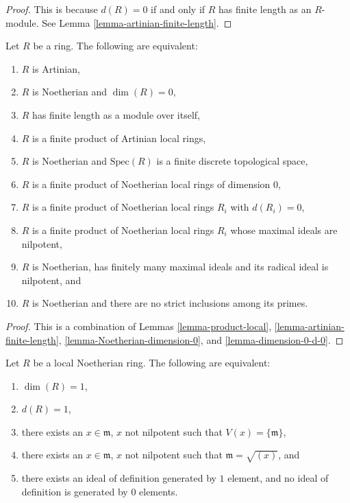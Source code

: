 \begin{proof}
This is because $d(R) = 0$ if and only if $R$ has finite
length as an $R$-module. See Lemma \ref{lemma-artinian-finite-length}.
\end{proof}

\begin{proposition}
\label{proposition-dimension-zero-ring}
Let $R$ be a ring. The following are equivalent:
\begin{enumerate}
\item $R$ is Artinian,
\item $R$ is Noetherian and $\dim(R) = 0$,
\item $R$ has finite length as a module over itself,
\item $R$ is a finite product of Artinian local rings,
\item $R$ is Noetherian and $\text{Spec}(R)$ is a
finite discrete topological space,
\item $R$ is a finite product of Noetherian local rings
of dimension $0$,
\item $R$ is a finite product of Noetherian local rings
$R_i$ with $d(R_i) = 0$,
\item $R$ is a finite product of Noetherian local rings
$R_i$ whose maximal ideals are nilpotent,
\item $R$ is Noetherian, has finitely many maximal
ideals and its radical ideal is nilpotent, and
\item $R$ is Noetherian and there are no strict inclusions
among its primes.
\end{enumerate}
\end{proposition}

\begin{proof}
This is a combination of Lemmas
\ref{lemma-product-local},
\ref{lemma-artinian-finite-length},
\ref{lemma-Noetherian-dimension-0}, and
\ref{lemma-dimension-0-d-0}.
\end{proof}

\begin{lemma}
\label{lemma-height-1}
Let $R$ be a local Noetherian ring.
The following are equivalent:
\begin{enumerate}
\item $\dim(R) = 1$,
\label{dim-1}
\item $d(R) = 1$,
\label{d-1}
\item there exists an $x \in \mathfrak m$, $x$ not nilpotent
such that $V(x) = \{\mathfrak m\}$,
\label{Vx}
\item there exists an $x \in \mathfrak m$, $x$ not nilpotent
such that $\mathfrak m = \sqrt{(x)}$, and
\label{x}
\item there exists an ideal of definition generated by $1$ element,
and no ideal of definition is generated by $0$ elements.
\label{ideal-1}
\end{enumerate}
\end{lemma}

